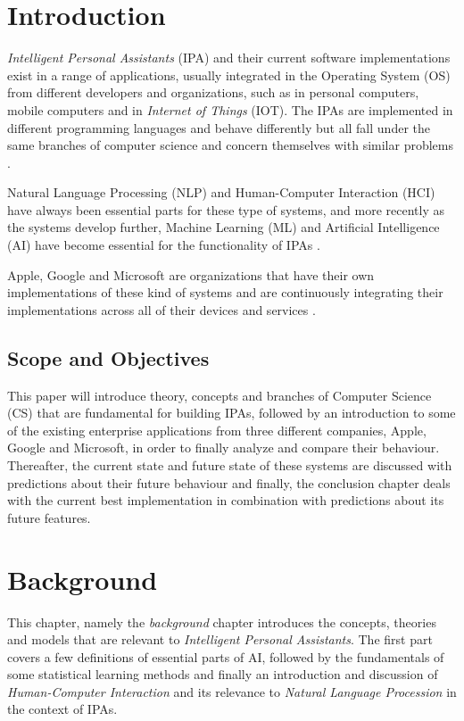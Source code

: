 \documentclass[preprint,12pt]{elsarticle}
\begin{document}
\newpage

\tableofcontents

\newpage

\section{Introduction}
\textit{Intelligent Personal Assistants} (IPA) and their current software implementations exist in a range of applications, usually integrated in the Operating System (OS) from different developers and organizations, such as in personal computers, mobile computers and in \textit{Internet of Things} (IOT). The IPAs are implemented in different programming languages and behave differently but all fall under the same branches of computer science and concern themselves with similar problems \cite{russel2009}.

Natural Language Processing (NLP) and Human-Computer Interaction (HCI) have always been essential parts for these type of systems, and more recently as the systems develop further, Machine Learning (ML) and Artificial Intelligence (AI) have become essential for the functionality of IPAs \cite{russel2009}.

Apple, Google and Microsoft are organizations that have their own implementations of these kind of systems and are continuously integrating their implementations across all of their devices and services  \cite{googlenow2016, applesiri2016, microsoftcortana2016}.

\subsection{Scope and Objectives}
This paper will introduce theory, concepts and branches of Computer Science (CS) that are fundamental for building IPAs, followed by an introduction to some of the existing enterprise applications from three different companies, Apple, Google and Microsoft, in order to finally analyze and compare their behaviour. Thereafter, the current state and future state of these systems are discussed with predictions about their future behaviour and finally, the conclusion chapter deals with the current best implementation in combination with predictions about its future features. 

\newpage

\section{Background}
This chapter, namely the \textit{background} chapter introduces the concepts, theories and models that are relevant to \textit{Intelligent Personal Assistants}. The first part covers a few definitions of essential parts of AI, followed by the fundamentals of some statistical learning methods and finally an introduction and discussion of \textit{Human-Computer Interaction} and its relevance to \textit{Natural Language Procession} in the context of IPAs.
\end{document}
